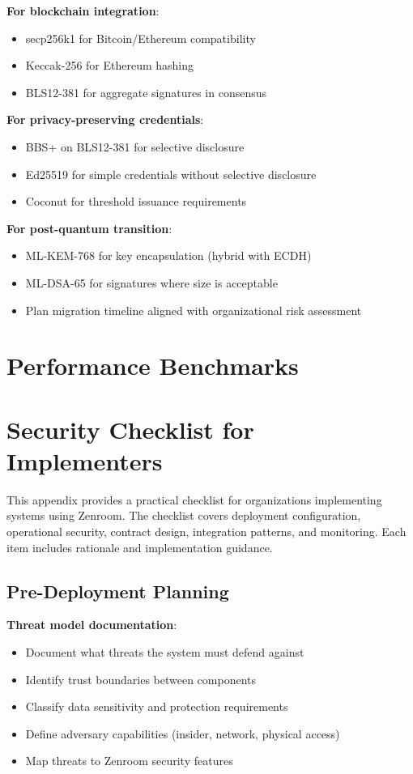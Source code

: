 \textbf{For blockchain integration}:
\begin{itemize}
\item secp256k1 for Bitcoin/Ethereum compatibility
\item Keccak-256 for Ethereum hashing
\item BLS12-381 for aggregate signatures in consensus
\end{itemize}

\textbf{For privacy-preserving credentials}:
\begin{itemize}
\item BBS+ on BLS12-381 for selective disclosure
\item Ed25519 for simple credentials without selective disclosure
\item Coconut for threshold issuance requirements
\end{itemize}

\textbf{For post-quantum transition}:
\begin{itemize}
\item ML-KEM-768 for key encapsulation (hybrid with ECDH)
\item ML-DSA-65 for signatures where size is acceptable
\item Plan migration timeline aligned with organizational risk
  assessment
\end{itemize}

\section{Performance Benchmarks}
\section{Security Checklist for Implementers}

This appendix provides a practical checklist for organizations
implementing systems using Zenroom. The checklist covers deployment
configuration, operational security, contract design, integration
patterns, and monitoring. Each item includes rationale and
implementation guidance.

\subsection{Pre-Deployment Planning}

\textbf{Threat model documentation}:

\begin{itemize}
\item Document what threats the system must defend against
\item Identify trust boundaries between components
\item Classify data sensitivity and protection requirements
\item Define adversary capabilities (insider, network, physical
  access)
\item Map threats to Zenroom security features
\end{itemize}

